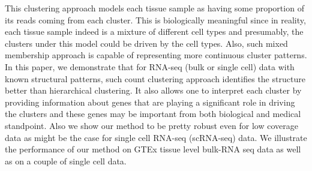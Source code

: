 This clustering approach models each tissue sample as having some proportion of its reads coming from each cluster. This is biologically meaningful since in reality, each tissue sample indeed is a mixture of different cell types and presumably, the clusters under this model could be driven by the cell types. Also, such mixed membership approach is capable of representing more continuous cluster patterns. \\[2 pt]

In this paper, we demonstrate that for RNA-seq (bulk or single cell) data with known structural patterns, such count clustering approach identifies the structure better than hierarchical clustering. It also allows one to interpret each cluster by providing information about genes that are playing a significant role in driving the clusters and these genes may be important from both biological and medical standpoint. Also we show our method to be pretty robust even for low coverage data as might be the case for single cell RNA-seq (scRNA-seq) data.
We illustrate the performance of our method on GTEx tissue level  bulk-RNA seq data as well as on a couple of single cell data. 


